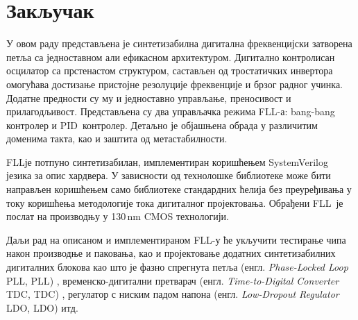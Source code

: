 \documentclass[master]{finthesis}
\makeatletter
\newcommand*{\engl}[2][\@empty]{%
    \edef\theacronym{#1}%
    (енгл. \foreignlanguage{english}{\emph{#2}%
    \ifx\theacronym\@empty \else , #1\fi})%
}
\def \FLL  {FLL} %
\def \PID  {PID} %
\makeatother
\begin{document}
\section{Закључак} \label{Conclusion}
У овом раду представљена је синтетизабилна дигитална фреквенцијски затворена петља са једноставном али ефикасном архитектуром. Дигитално контролисан осцилатор са прстенастом структуром, састављен од тростатичких инвертора омогућава достизање пристојне резолуције фреквенције и брзог радног учинка. Додатне предности су му и једноставно управљање, преносивост и прилагодљивост. Представљена су два управљачка режима \FLL-а: bang-bang контролер и \PID\ контролер. Детаљно је објашњена обрада у различитим доменима такта, као и заштита од метастабилности. \par
\FLL је потпуно синтетизабилан, имплементиран коришћењем SystemVerilog језика за опис хардвера. У зависности од технолошке библиотеке може бити направљен коришћењем само библиотеке стандардних ћелија без преуређивања у току коришћења методологије тока дигиталног пројектовања. Обрађени \FLL\ је послат на производњу у 130\,nm CMOS технологији. \par
Даљи рад на описаном и имплементираном \FLL-у ће укључити тестирање чипа након производње и паковања, као и пројектовање додатних синтетизабилних дигиталних блокова као што је фазно спрегнута петља \engl[PLL]{Phase-Locked Loop}, временско-дигитални претварач \engl[TDC]{Time-to-Digital Converter}, регулатор с ниским падом напона \engl[LDO]{Low-Dropout Regulator} итд.


\makebibliography
\end{document}
